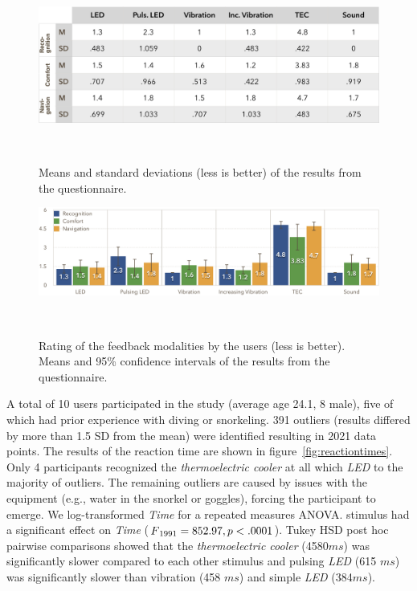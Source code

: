 \begin{figure}
	\includegraphics[width=\columnwidth]{images/m_sd_table_noranking}
	\caption{Means and standard deviations (less is better) of the results from the questionnaire.}~\label{fig:m_sd_table}
\end{figure}

\begin{figure}
	\includegraphics[width=\columnwidth]{images/GraphQuestionnaireNoranking.png}
	\caption{Rating of the feedback modalities by the users (less is better). Means and 95\% confidence intervals of the results from the questionnaire.}~\label{fig:questionnaire}
\end{figure}

A total of 10 users participated in the study (average age 24.1, 8 male), five of which had prior experience with diving or snorkeling. 
391 outliers (results differed by more than 1.5 SD from the mean) were identified resulting in 2021 data points.
The results of the reaction time are shown in figure~\ref{fig:reactiontimes}.
Only 4 participants recognized the \emph{thermoelectric cooler} at all which \emph{LED} to the majority of outliers. 
The remaining outliers are caused by issues with the equipment (e.g., water in the snorkel or goggles), forcing the participant to emerge.
We log-transformed \emph{Time} for a repeated measures ANOVA. 
{\sc stimulus} had a significant effect on \emph{Time} ($F\textsubscript{1991} = 852.97, p<.0001$). 
Tukey HSD post hoc pairwise comparisons showed that the \emph{thermoelectric cooler} (4580$ms$) was significantly slower compared to each other {\sc stimulus} and pulsing \emph{LED} (615 $ms$) was significantly slower than vibration (458 $ms$) and simple \emph{LED} (384$ms$).

